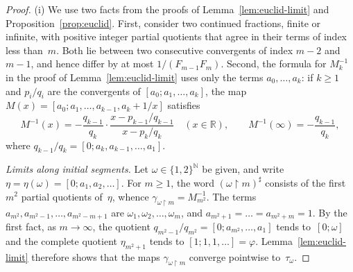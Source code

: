\documentclass[psamsfonts]{amsart}
\theoremstyle{definition}
\theoremstyle{remark}
\newcommand{\restr}{{\restriction}}
\numberwithin{equation}{section}
\begin{document}
\begin{proof}
(i) We use two facts from the proofs of Lemma~\ref{lem:euclid-limit} and Proposition~\ref{prop:euclid}.
First, consider two continued fractions, finite or infinite, with positive integer partial quotients that agree in their terms of index less than~$m$.
Both lie between two consecutive convergents of index $m-2$ and $m-1$, and hence differ by at most $1/(F_{m-1}F_m)$.
Second, the formula for $M_k^{-1}$ in the proof of Lemma~\ref{lem:euclid-limit} uses only the terms $a_0,\dots,a_k$:
if $k\ge1$ and $p_i/q_i$ are the convergents of $[a_0;a_1,\dots,a_k]$, the map $M(x)=[a_0;a_1,\dots,a_{k-1},a_k+1/x]$ satisfies
\begin{equation}\label{eq:Mobius-inverse}
M^{-1}(x)=-\frac{q_{k-1}}{q_k}\cdot\frac{x-p_{k-1}/q_{k-1}}{x-p_k/q_k}\quad(x\in\mathbb{R}),
\qquad
M^{-1}(\infty)=-\frac{q_{k-1}}{q_k},
\end{equation}
where $q_{k-1}/q_k=[0;a_k,a_{k-1},\dots,a_1]$.

\emph{Limits along initial segments.}
Let $\omega\in\{1,2\}^{\mathbb{N}}$ be given, and write $\eta=\eta(\omega)=[0;a_1,a_2,\dots]$.
For $m\ge1$, the word $(\omega\restr m)^\sharp$ consists of the first $m^2$ partial quotients of~$\eta$, whence $\gamma_{\omega\restr m}=M_{m^2}^{-1}$.
The terms $a_{m^2},a_{m^2-1},\dots,a_{m^2-m+1}$ are $\omega_1,\omega_2,\dots,\omega_m$, and $a_{m^2+1}=\dots=a_{m^2+m}=1$.
By the first fact, as $m\to\infty$, the quotient $q_{m^2-1}/q_{m^2}=[0;a_{m^2},\dots,a_1]$ tends to~$[0;\omega]$ and the complete quotient $\eta_{m^2+1}$ tends to $[1;1,1,\dots]=\varphi$.
Lemma~\ref{lem:euclid-limit} therefore shows that the maps $\gamma_{\omega\restr m}$ converge pointwise to~$\tau_\omega$.


\end{proof}
\end{document}
